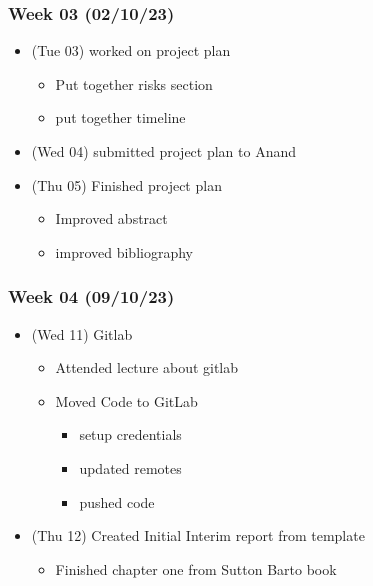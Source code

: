 \hypertarget{week-03-021023}{%
  \subsubsection{Week 03 (02/10/23)}\label{week-03-021023}}

\begin{itemize}
  \tightlist
  \item
        (Tue 03) worked on project plan

        \begin{itemize}
          \tightlist
          \item
                Put together risks section
          \item
                put together timeline
        \end{itemize}
  \item
        (Wed 04) submitted project plan to Anand
  \item
        (Thu 05) Finished project plan

        \begin{itemize}
          \tightlist
          \item
                Improved abstract
          \item
                improved bibliography
        \end{itemize}
\end{itemize}

\hypertarget{week-04-091023}{%
  \subsubsection{Week 04 (09/10/23)}\label{week-04-091023}}

\begin{itemize}
  \tightlist
  \item
        (Wed 11) Gitlab

        \begin{itemize}
          \tightlist
          \item
                Attended lecture about gitlab
          \item
                Moved Code to GitLab

                \begin{itemize}
                  \tightlist
                  \item
                        setup credentials
                  \item
                        updated remotes
                  \item
                        pushed code
                \end{itemize}
        \end{itemize}
  \item
        (Thu 12) Created Initial Interim report from template

        \begin{itemize}
          \tightlist
          \item
                Finished chapter one from Sutton Barto book
        \end{itemize}
\end{itemize}

